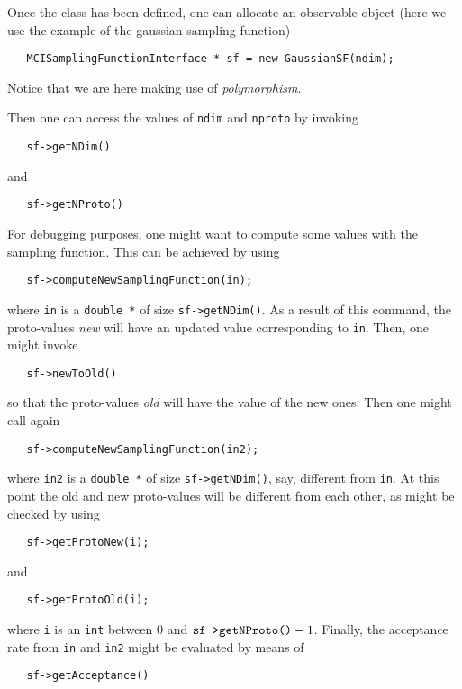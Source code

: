 \documentclass[11pt,a4paper,twoside]{article}
\begin{document}
Once the class has been defined, one can allocate an observable object (here we use the example of the gaussian sampling function)
\begin{verbatim}
   MCISamplingFunctionInterface * sf = new GaussianSF(ndim);
\end{verbatim}
Notice that we are here making use of \emph{polymorphism}.

Then one can access the values of \verb+ndim+ and \verb+nproto+ by invoking
\begin{verbatim}
   sf->getNDim()
\end{verbatim}
and
\begin{verbatim}
   sf->getNProto()
\end{verbatim}

For debugging purposes, one might want to compute some values with the sampling function.
This can be achieved by using
\begin{verbatim}
   sf->computeNewSamplingFunction(in);
\end{verbatim}
where \verb+in+ is a \verb+double *+ of size \verb+sf->getNDim()+.
As a result of this command, the proto-values \emph{new} will have an updated value corresponding to \verb+in+.
Then, one might invoke
\begin{verbatim}
   sf->newToOld()
\end{verbatim}
so that the proto-values \emph{old} will have the value of the new ones.
Then one might call again
\begin{verbatim}
   sf->computeNewSamplingFunction(in2);
\end{verbatim}
where \verb+in2+ is a \verb+double *+ of size \verb+sf->getNDim()+, say, different from \verb+in+.
At this point the old and new proto-values will be different from each other, as might be checked by using
\begin{verbatim}
   sf->getProtoNew(i);
\end{verbatim}
and
\begin{verbatim}
   sf->getProtoOld(i);
\end{verbatim}
where \verb+i+ is an \verb+int+ between $0$ and $\verb+sf->getNProto()+ - 1$.
Finally, the acceptance rate from \verb+in+ and \verb+in2+ might be evaluated by means of
\begin{verbatim}
   sf->getAcceptance()
\end{verbatim}


\end{document}
